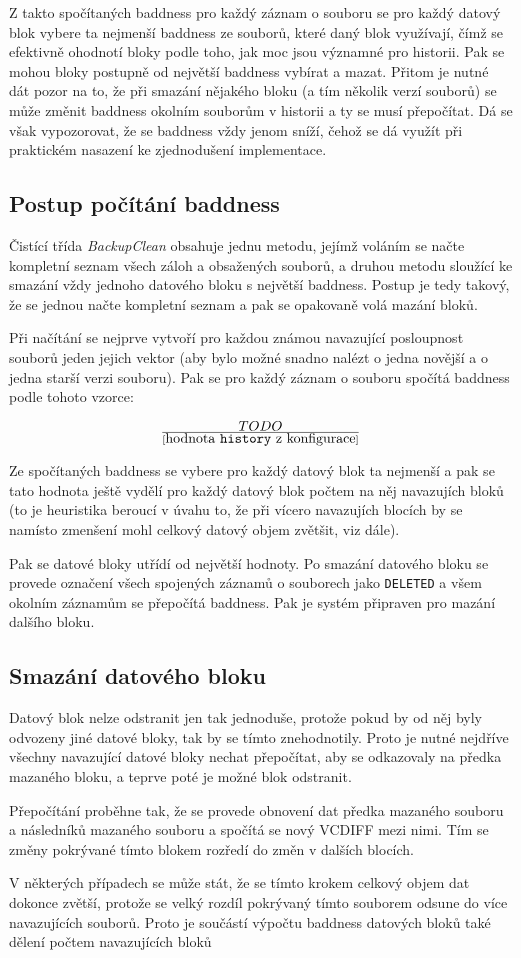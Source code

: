 Z takto spočítaných baddness pro každý záznam o souboru se pro každý datový
blok vybere ta nejmenší baddness ze souborů, které daný blok využívají, čímž se
efektivně ohodnotí bloky podle toho, jak moc jsou významné pro historii. Pak se
mohou bloky postupně od největší baddness vybírat a mazat. Přitom je nutné dát
pozor na to, že při smazání nějakého bloku (a tím několik verzí souborů) se
může změnit baddness okolním souborům v historii a ty se musí přepočítat. Dá se
však vypozorovat, že se baddness vždy jenom sníží, čehož se dá využít při
praktickém nasazení ke zjednodušení implementace.

\subsection{Postup počítání baddness}

Čistící třída {\it BackupClean} obsahuje jednu metodu, jejímž voláním se načte
kompletní seznam všech záloh a obsažených souborů, a druhou metodu sloužící ke
smazání vždy jednoho datového bloku s největší baddness. Postup je tedy takový,
že se jednou načte kompletní seznam a pak se opakovaně volá mazání bloků.

Při načítání se nejprve vytvoří pro každou známou navazující posloupnost souborů
jeden jejich vektor (aby bylo možné snadno nalézt o jedna novější a o jedna
starší verzi souboru). Pak se pro každý záznam o souboru spočítá baddness podle
tohoto vzorce:

$$TODO\over[\hbox{hodnota \texttt{history} z konfigurace}]$$

Ze spočítaných baddness se vybere pro každý datový blok ta nejmenší a pak se
tato hodnota ještě vydělí pro každý datový blok počtem na něj navazujích bloků
(to je heuristika beroucí v úvahu to, že při vícero navazujích blocích by se
namísto zmenšení mohl celkový datový objem zvětšit, viz dále).

Pak se datové bloky utřídí od největší hodnoty. Po smazání datového bloku se
provede označení všech spojených záznamů o souborech jako \texttt{DELETED} a
všem okolním záznamům se přepočítá baddness. Pak je systém připraven pro mazání
dalšího bloku.

\subsection{Smazání datového bloku}

Datový blok nelze odstranit jen tak jednoduše, protože pokud by od něj byly
odvozeny jiné datové bloky, tak by se tímto znehodnotily. Proto je nutné
nejdříve všechny navazující datové bloky nechat přepočítat, aby se odkazovaly
na předka mazaného bloku, a teprve poté je možné blok odstranit.

Přepočítání proběhne tak, že se provede obnovení dat předka mazaného souboru a následníků mazaného souboru a spočítá se nový \gls{VCDIFF} mezi nimi. Tím se
změny pokrývané tímto blokem rozředí do změn v dalších blocích.

V některých případech se může stát, že se tímto krokem celkový objem dat dokonce
zvětší, protože se velký rozdíl pokrývaný tímto souborem odsune do více
navazujících souborů. Proto je součástí výpočtu baddness datových bloků také
dělení počtem navazujících bloků
